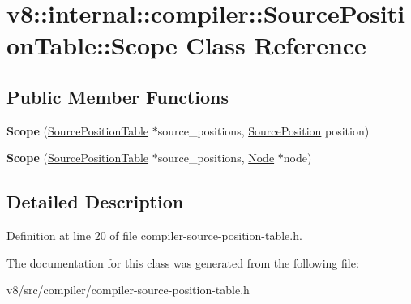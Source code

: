 \hypertarget{classv8_1_1internal_1_1compiler_1_1SourcePositionTable_1_1Scope}{}\section{v8\+:\+:internal\+:\+:compiler\+:\+:Source\+Position\+Table\+:\+:Scope Class Reference}
\label{classv8_1_1internal_1_1compiler_1_1SourcePositionTable_1_1Scope}
\subsection*{Public Member Functions}
\begin{DoxyCompactItemize}
\item 
\mbox{\label{classv8_1_1internal_1_1compiler_1_1SourcePositionTable_1_1Scope_a4f4f13e36aca0b2a7ba0c01a189556de}} 
{\bfseries Scope} (\mbox{\hyperlink{classv8_1_1internal_1_1compiler_1_1SourcePositionTable}{Source\+Position\+Table}} $\ast$source\+\_\+positions, \mbox{\hyperlink{classv8_1_1internal_1_1SourcePosition}{Source\+Position}} position)
\item 
\mbox{\label{classv8_1_1internal_1_1compiler_1_1SourcePositionTable_1_1Scope_a9463054754362dca3e6654bb38c1f1d4}} 
{\bfseries Scope} (\mbox{\hyperlink{classv8_1_1internal_1_1compiler_1_1SourcePositionTable}{Source\+Position\+Table}} $\ast$source\+\_\+positions, \mbox{\hyperlink{classv8_1_1internal_1_1compiler_1_1Node}{Node}} $\ast$node)
\end{DoxyCompactItemize}


\subsection{Detailed Description}


Definition at line 20 of file compiler-\/source-\/position-\/table.\+h.



The documentation for this class was generated from the following file\+:\begin{DoxyCompactItemize}
\item 
v8/src/compiler/compiler-\/source-\/position-\/table.\+h\end{DoxyCompactItemize}
